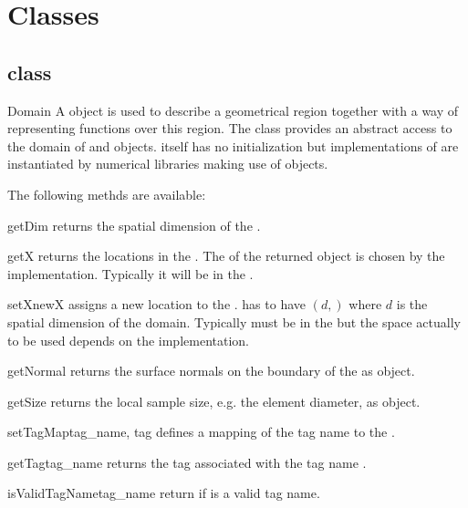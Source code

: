 \section{\escript Classes}

\subsection{\Domain class}
\begin{classdesc}{Domain}{}
A \Domain object is used to describe a geometrical region together with 
a way of representing functions over this region.
The \Domain class provides an abstract access to the domain of \FunctionSpace and \Data objects. 
\Domain itself has no initialization but implementations of \Domain are 
instantiated by numerical libraries making use of \Data objects. 
\end{classdesc}
The following methds are available:
\begin{methoddesc}[Domain]{getDim}{}
returns the spatial dimension of the \Domain.
\end{methoddesc}

\begin{methoddesc}[Domain]{getX}{}
returns the locations in the \Domain. The \FunctionSpace of the returned
\Data object is chosen by the \Domain implementation. Typically it will be
in the \Function.
\end{methoddesc}

\begin{methoddesc}[Domain]{setX}{newX}
assigns a new location to the \Domain.  has to have \Shape $(d,)$
where $d$ is the spatial dimension of the domain. Typically  must be
in the \ContinuousFunction but the space actually to be used depends on the \Domain implementation.
\end{methoddesc}

\begin{methoddesc}[Domain]{getNormal}{}
returns the surface normals on the boundary of the \Domain as \Data object.
\end{methoddesc}

\begin{methoddesc}[Domain]{getSize}{}
returns the local sample size, e.g. the element diameter, as \Data object.
\end{methoddesc}

\begin{methoddesc}[Domain]{setTagMap}{tag_name, tag}
defines a mapping of the tag name   to the . 
\end{methoddesc}
\begin{methoddesc}[Domain]{getTag}{tag_name}
returns the tag associated with the tag name .
\end{methoddesc}
\begin{methoddesc}[Domain]{isValidTagName}{tag_name}
return \True if  is a valid tag name.
\end{methoddesc}

